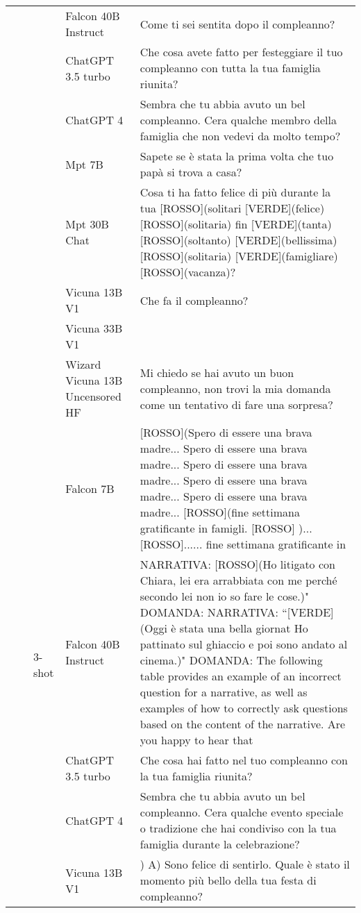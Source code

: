 \begin{center}
\begin{longtable}{l|l|l|p{3cm}|p{8cm}}
 &  &  & Falcon 40B Instruct & Come ti sei sentita dopo il compleanno? \\
 &  &  & ChatGPT 3.5 turbo & Che cosa avete fatto per festeggiare il tuo compleanno con tutta la tua famiglia riunita? \\
 &  &  & ChatGPT 4 & Sembra che tu abbia avuto un bel compleanno. Cera qualche membro della famiglia che non vedevi da molto tempo? \\
 &  &  & Mpt 7B &  Sapete se è stata la prima volta che tuo papà si trova a casa? \\
 &  &  & Mpt 30B Chat &  Cosa ti ha fatto felice di più durante la tua [ROSSO](solitari [VERDE](felice) [ROSSO](solitaria) fin [VERDE](tanta) [ROSSO](soltanto) [VERDE](bellissima) [ROSSO](solitaria) [VERDE](famigliare) [ROSSO](vacanza)? \\
 &  &  & Vicuna 13B V1 &  Che fa il compleanno? \\
 &  &  & Vicuna 33B V1 &  \\
 &  &  & Wizard Vicuna 13B Uncensored HF & Mi chiedo se hai avuto un buon compleanno, non trovi la mia domanda come un tentativo di fare una sorpresa? \\
\cline{3-5}
 &  & \multirow[c]{7}{*}{3-shot} & Falcon 7B &  [ROSSO](Spero di essere una brava madre... Spero di essere una brava madre... Spero di essere una brava madre... Spero di essere una brava madre... Spero di essere una brava madre... [ROSSO](fine settimana gratificante in famigli. [ROSSO] )... [ROSSO]...... fine settimana gratificante in \\
 &  &  & Falcon 40B Instruct & NARRATIVA: [ROSSO](Ho litigato con Chiara, lei era arrabbiata con me perché secondo lei non io so fare le cose.)" DOMANDA: NARRATIVA: ``[VERDE](Oggi è stata una bella giornat Ho pattinato sul ghiaccio e poi sono andato al cinema.)" DOMANDA: The following table provides an example of an incorrect question for a narrative, as well as examples of how to correctly ask questions based on the content of the narrative.  Are you happy to hear that \\
 &  &  & ChatGPT 3.5 turbo & Che cosa hai fatto nel tuo compleanno con la tua famiglia riunita? \\
 &  &  & ChatGPT 4 & Sembra che tu abbia avuto un bel compleanno. Cera qualche evento speciale o tradizione che hai condiviso con la tua famiglia durante la celebrazione? \\
 &  &  & Vicuna 13B V1 & ) A) Sono felice di sentirlo. Quale è stato il momento più bello della tua festa di compleanno? \\

\end{longtable}
\end{center}
